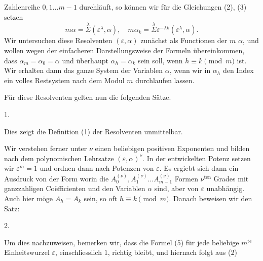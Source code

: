 
Zahlenreihe $0, 1 \ldots m-1$ durchläuft, so können wir für die Gleichungen (2), (3) setzen
\[
m\alpha = \overset{\lambda}{\Sigma}(\varepsilon^\lambda, \alpha), \quad m\alpha_k = \overset{\lambda}{\Sigma}\varepsilon^{-\lambda k}(\varepsilon^\lambda, \alpha).
\]
Wir untersuchen diese Resolventen $(\varepsilon, \alpha)$ zunächst als Functionen der $m$  $\alpha$, und wollen wegen der einfacheren Darstellungsweise der Formeln übereinkommen, dass $\alpha_m = \alpha_0 = \alpha$ und überhaupt $\alpha_h = \alpha_k$ sein soll, wenn $h \equiv k \pmod{m}$ ist. Wir erhalten dann das ganze System der Variablen $\alpha$, wenn wir in $\alpha_h$ den Index ein volles Restsystem nach dem Modul $m$ durchlaufen lassen.

Für diese Resolventen gelten nun die folgenden Sätze.

1. 

Dies zeigt die Definition (1) der Resolventen unmittelbar.

Wir verstehen ferner unter $\nu$ einen beliebigen positiven Exponenten und bilden nach dem polynomischen Lehrsatze $(\varepsilon, \alpha)^\nu$. In der entwickelten Potenz setzen wir $\varepsilon^m = 1$ und ordnen dann nach Potenzen von $\varepsilon$. Es ergiebt sich dann ein Ausdruck von der Form
worin die $A_0^{(\nu)}, A_1^{(\nu)} \ldots A_{m-1}^{(\nu)}$ Formen $\nu^{\text{ten}}$ Grades mit ganzzahligen Coëfficienten und den Variablen $\alpha$ sind, aber von $\varepsilon$ unabhängig. Auch hier möge $A_h = A_k$ sein, so oft $h \equiv k \pmod{m}$. Danach beweisen wir den Satz:

2. 

Um dies nachzuweisen, bemerken wir, dass die Formel (5) für jede beliebige $m^{\text{te}}$ Einheitswurzel $\varepsilon$, einschliesslich $1$, richtig bleibt, und hiernach folgt aus (2)
